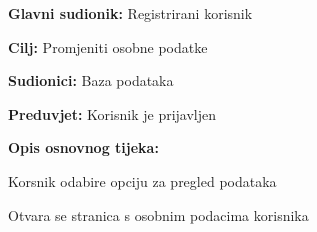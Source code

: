 				\noindent {}
					\begin{packed_item}
	
						\item \textbf{Glavni sudionik: }Registrirani korisnik
						\item  \textbf{Cilj:} Promjeniti osobne podatke
						\item  \textbf{Sudionici:} Baza podataka
						\item  \textbf{Preduvjet:} Korisnik je prijavljen
						\item  \textbf{Opis osnovnog tijeka:}
						
						\item[] \begin{packed_enum}
	
							\item Korsnik odabire opciju za pregled podataka
							\item Otvara se stranica s osobnim podacima korisnika

						\end{packed_enum}						
					\end{packed_item}
					
